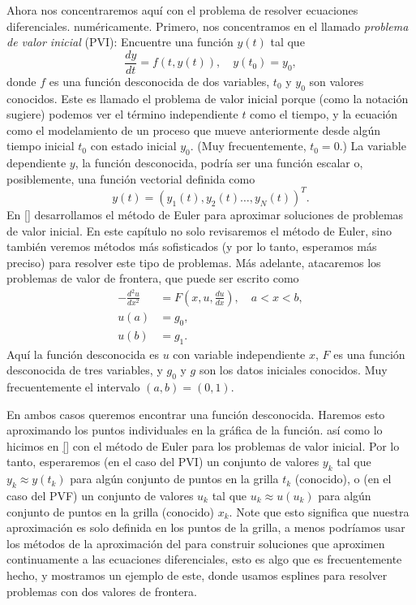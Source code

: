 Ahora nos concentraremos aquí con el problema de resolver ecuaciones diferenciales. numéricamente. Primero, nos concentramos en el llamado \emph{problema de valor inicial} (PVI): Encuentre una función $y\left(t\right)$ tal que \[ \frac{dy}{dt}=f\left(t,y\left(t\right)\right),\quad y\left(t_{0}\right)=y_{0}, \] donde $f$ es una función desconocida de dos variables, $t_{0}$ y $y_{0}$ son valores conocidos. Este es llamado el problema de valor inicial porque (como la notación sugiere) podemos ver el término independiente $t$ como el tiempo, y la ecuación como el modelamiento de un proceso que mueve anteriormente desde algún tiempo inicial $t_{0}$ con estado inicial $y_{0}$. (Muy frecuentemente, $t_{0}=0$.) La variable dependiente $y$, la función desconocida, podría ser una función escalar o, posiblemente, una función vectorial definida como \[ y\left(t\right)={\left(y_{1}\left(t\right),y_{2}\left(t\right)\ldots,y_{N}\left(t\right)\right)}^{T}. \] En \ref{} desarrollamos el método de Euler para aproximar soluciones de problemas de valor inicial. En este capítulo no solo revisaremos el método de Euler, sino también veremos métodos más sofisticados (y por lo tanto, esperamos más preciso) para resolver este tipo de problemas. Más adelante, atacaremos los problemas de valor de frontera, que puede ser escrito como
\begin{align*}
-\frac{d^{2}u}{dx^{2}}&=F\left(x,u,\frac{du}{dx}\right),\quad a<x<b,\\
u\left(a\right)&=g_{0},\\
u\left(b\right)&=g_{1}.
\end{align*}
Aquí la función desconocida es $u$ con variable independiente $x$, $F$ es una función desconocida de tres variables, y $g_{0}$ y $g$ son los datos iniciales conocidos. Muy frecuentemente el intervalo $\left(a,b\right)=\left(0,1\right)$.

En ambos casos queremos encontrar una función desconocida. Haremos esto aproximando los puntos individuales en la gráfica de la función. así como lo hicimos en \ref{} con el método de Euler para los problemas de valor inicial. Por lo tanto, esperaremos (en el caso del PVI) un conjunto de valores $y_{k}$ tal que $y_{k}\approx y\left(t_{k}\right)$ para algún conjunto de puntos en la grilla $t_{k}$ (conocido), o (en el caso del PVF) un conjunto de valores $u_{k}$ tal que $u_{k}\approx u\left(u_{k}\right)$ para algún conjunto de puntos en la grilla (conocido) $x_{k}$. Note que esto significa que nuestra aproximación es solo definida en los puntos de la grilla, a menos podríamos usar los métodos de la aproximación del %
 para construir soluciones que aproximen continuamente a las ecuaciones diferenciales, esto es algo que es frecuentemente hecho, y mostramos un ejemplo de este, donde usamos esplines para resolver problemas con dos valores de frontera.
 

